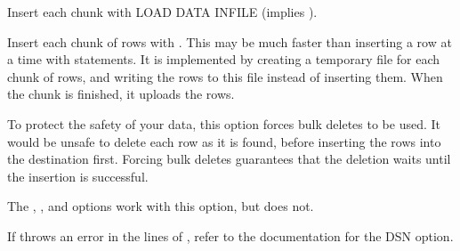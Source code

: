 \documentclass[letterpaper,10pt,english]{sphinxmanual}
\begin{document}
\begin{fulllineitems}
\label{\detokenize{mariadb-archiver:cmdoption-mariadb-archiver-bulk-insert}}
Insert each chunk with LOAD DATA INFILE (implies {\hyperref[\detokenize{mariadb-archiver:cmdoption-mariadb-archiver-bulk-delete}]{}} {\hyperref[\detokenize{mariadb-archiver:cmdoption-mariadb-archiver-commit-each}]{}}).

Insert each chunk of rows with .  This may be much
faster than inserting a row at a time with  statements.  It is
implemented by creating a temporary file for each chunk of rows, and writing the
rows to this file instead of inserting them.  When the chunk is finished, it
uploads the rows.

To protect the safety of your data, this option forces bulk deletes to be used.
It would be unsafe to delete each row as it is found, before inserting the rows
into the destination first.  Forcing bulk deletes guarantees that the deletion
waits until the insertion is successful.

The {\hyperref[\detokenize{mariadb-archiver:cmdoption-mariadb-archiver-low-priority-insert}]{}}, {\hyperref[\detokenize{mariadb-archiver:cmdoption-mariadb-archiver-replace}]{}}, and {\hyperref[\detokenize{mariadb-archiver:cmdoption-mariadb-archiver-ignore}]{}} options work
with this option, but {\hyperref[\detokenize{mariadb-archiver:cmdoption-mariadb-archiver-delayed-insert}]{}} does not.

If  throws an error in the lines of , refer to the documentation
for the  DSN option.

\end{fulllineitems}
\end{document}
